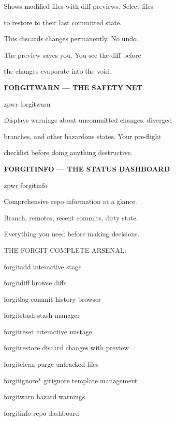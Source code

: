 \documentclass[11pt,a4paper,twoside]{book}
\begin{document}
Shows modified files with diff previews. Select files

to restore to their last committed state.

This discards changes permanently. No undo.

The preview saves you. You see the diff before

the changes evaporate into the void.


\vspace{12pt}
{\bfseries\color{neonyellow} FORGITWARN — THE SAFETY NET}\vspace{4pt}

\begin{codebox}
zpwr forgitwarn\\
\end{codebox}

Displays warnings about uncommitted changes, diverged

branches, and other hazardous states. Your pre-flight

checklist before doing anything destructive.


\vspace{12pt}
{\bfseries\color{neonyellow} FORGITINFO — THE STATUS DASHBOARD}\vspace{4pt}

\begin{codebox}
zpwr forgitinfo\\
\end{codebox}

Comprehensive repo information at a glance.

Branch, remotes, recent commits, dirty state.

Everything you need before making decisions.

THE FORGIT COMPLETE ARSENAL:

forgitadd        interactive stage

forgitdiff       browse diffs

forgitlog        commit history browser

forgitstash      stash manager

forgitreset      interactive unstage

forgitrestore    discard changes with preview

forgitclean      purge untracked files

forgitignore*    gitignore template management

forgitwarn       hazard warnings

forgitinfo       repo dashboard
\end{document}
